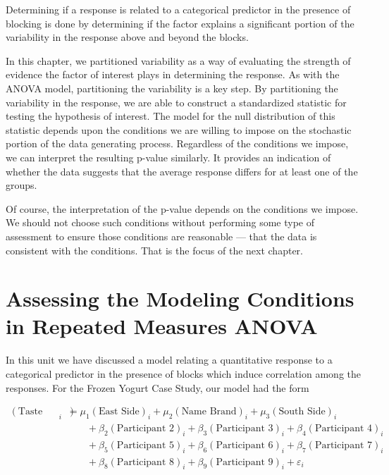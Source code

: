\documentclass[
  letterpaper,
  DIV=11,
  numbers=noendperiod]{scrreprt}
\theoremstyle{plain}
\theoremstyle{definition}
\theoremstyle{definition}
\theoremstyle{remark}
\begin{document}
\begin{tcolorbox}[enhanced jigsaw, breakable, titlerule=0mm, colframe=quarto-callout-tip-color-frame, bottomtitle=1mm, opacityback=0, rightrule=.15mm, toptitle=1mm, arc=.35mm, bottomrule=.15mm, left=2mm, title=\textcolor{quarto-callout-tip-color}{\faLightbulb}\hspace{0.5em}{Big Idea}, leftrule=.75mm, coltitle=black, toprule=.15mm, colbacktitle=quarto-callout-tip-color!10!white, colback=white, opacitybacktitle=0.6]

Determining if a response is related to a categorical predictor in the
presence of blocking is done by determining if the factor explains a
significant portion of the variability in the response above and beyond
the blocks.

\end{tcolorbox}

In this chapter, we partitioned variability as a way of evaluating the
strength of evidence the factor of interest plays in determining the
response. As with the ANOVA model, partitioning the variability is a key
step. By partitioning the variability in the response, we are able to
construct a standardized statistic for testing the hypothesis of
interest. The model for the null distribution of this statistic depends
upon the conditions we are willing to impose on the stochastic portion
of the data generating process. Regardless of the conditions we impose,
we can interpret the resulting p-value similarly. It provides an
indication of whether the data suggests that the average response
differs for at least one of the groups.

Of course, the interpretation of the p-value depends on the conditions
we impose. We should not choose such conditions without performing some
type of assessment to ensure those conditions are reasonable --- that
the data is consistent with the conditions. That is the focus of the
next chapter.

\chapter{Assessing the Modeling Conditions in Repeated Measures
ANOVA}\label{sec-blockassessment}

In this unit we have discussed a model relating a quantitative response
to a categorical predictor in the presence of blocks which induce
correlation among the responses. For the Frozen Yogurt Case Study, our
model had the form

\[
\begin{aligned}
  (\text{Taste Rating})_i &= \mu_1 (\text{East Side})_i + \mu_2 (\text{Name Brand})_i + \mu_3 (\text{South Side})_i \\
    &\qquad + \beta_2 (\text{Participant 2})_i + \beta_3 (\text{Participant 3})_i + \beta_4 (\text{Participant 4})_i \\
    &\qquad + \beta_5 (\text{Participant 5})_i + \beta_6 (\text{Participant 6})_i + \beta_7 (\text{Participant 7})_i \\
    &\qquad + \beta_8 (\text{Participant 8})_i + \beta_9 (\text{Participant 9})_i + \varepsilon_i
\end{aligned}
\]
\end{document}
